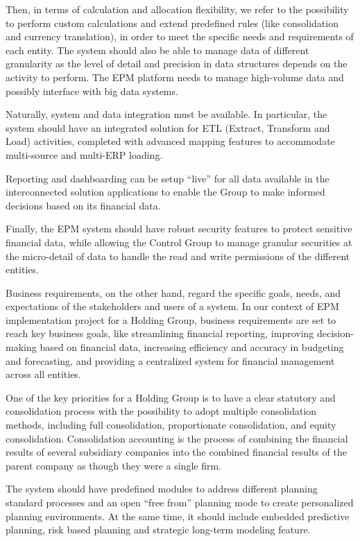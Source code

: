 \documentclass[12pt,a4paper,openright,twoside]{book}
\begin{document}
Then, in terms of calculation and allocation flexibility, we refer to the possibility to perform custom calculations and extend predefined rules (like consolidation and currency translation), in order to meet the specific needs and requirements of each entity.
%
The system should also be able to manage data of different granularity as the level of detail and precision in data structures depends on the activity to perform.
%
The EPM platform needs to manage high-volume data and possibly interface with big data systems.

Naturally, system and data integration must be available.
%
In particular, the system should have an integrated solution for ETL (Extract, Transform and Load) activities, completed with advanced mapping features to accommodate multi-source and multi-ERP loading.

Reporting and dashboarding can be setup ``live'' for all data available in the interconnected solution
applications to enable the Group to make informed decisions based on its financial data.

Finally, the EPM system should have robust security features to protect sensitive financial data, while allowing the Control Group to manage granular securities at the micro-detail of data to handle the read and write permissions of the different entities.

Business requirements, on the other hand, regard the specific goals, needs, and expectations of the stakeholders and users of a system. 
%
In our context of EPM implementation project for a Holding Group, business requirements are set to reach key business goals, like streamlining financial reporting, improving decision-making based on financial data, increasing efficiency and accuracy in budgeting and forecasting, and providing a centralized system for financial management across all entities. 

One of the key priorities for a Holding Group is to have a clear statutory and consolidation process with the possibility to adopt multiple consolidation methods, including full consolidation, proportionate consolidation, and equity consolidation.
%
Consolidation accounting is the process of combining the financial results of several subsidiary companies into the combined financial results of the parent company as though they were a single firm.

The system should have predefined modules to address different planning standard processes and an open ``free from'' planning mode to create personalized planning environments. 
%
At the same time, it should include embedded predictive planning, risk based planning and strategic  long-term modeling feature.
\end{document}
